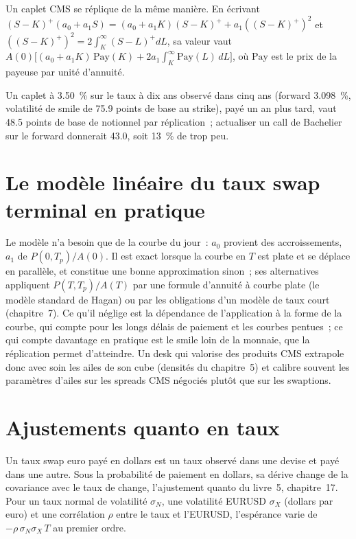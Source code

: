 Un caplet CMS se réplique de la même manière. En écrivant $(S-K)^+(a_0+a_1S) =
(a_0+a_1K)(S-K)^+ + a_1((S-K)^+)^2$ et $((S-K)^+)^2 = 2\int_K^\infty(S-L)^+dL$,
sa valeur vaut $A(0)\bigl[(a_0+a_1K)\,\mathrm{Pay}(K) + 2a_1\int_K^\infty
\mathrm{Pay}(L)\,dL\bigr]$, où $\mathrm{Pay}$ est le prix de la payeuse par unité d'annuité.

\label{lst:rc:convexity-adjustments-and-constant-maturity-products:caplet}

\begin{example}\label{ex:rc:convexity-adjustments-and-constant-maturity-products:caplet}
Un caplet à 3.50~\% sur le taux à dix ans observé dans cinq ans (forward
3.098~\%, volatilité de smile de 75.9 points de base au strike), payé un an
plus tard, vaut 48.5 points de base de notionnel par réplication~; actualiser un
call de Bachelier sur le forward donnerait 43.0, soit 13~\% de trop peu.
\end{example}

\section{Le modèle linéaire du taux swap terminal en pratique}

Le modèle n'a besoin que de la courbe du jour~: $a_0$ provient des accroissements, $a_1$ de
$P(0,T_p)/A(0)$. Il est exact lorsque la courbe en $T$ est plate et se déplace en
parallèle, et constitue une bonne approximation sinon~; ses alternatives appliquent
$P(T,T_p)/A(T)$ par une formule d'annuité à courbe plate (le modèle standard de Hagan)
ou par les obligations d'un modèle de taux court (chapitre~7). Ce qu'il néglige est la
dépendance de l'application à la forme de la courbe, qui compte pour les longs délais de
paiement et les courbes pentues~; ce qui compte davantage en pratique est le smile loin de
la monnaie, que la réplication permet d'atteindre. Un desk qui valorise des produits CMS
extrapole donc avec soin les ailes de son cube (densités du chapitre~5) et calibre souvent
les paramètres d'ailes sur les spreads CMS négociés plutôt que sur les swaptions.

\section{Ajustements quanto en taux}

Un taux swap euro payé en dollars est un taux observé dans une devise et payé dans
une autre. Sous la probabilité de paiement en dollars, sa dérive change de la covariance
avec le taux de change, l'ajustement quanto du livre~5, chapitre~17.
Pour un taux normal de volatilité $\sigma_N$, une volatilité EURUSD $\sigma_X$
(dollars par euro) et une corrélation $\rho$ entre le taux et l'EURUSD, l'espérance
varie de $-\rho\,\sigma_N\sigma_X\,T$ au premier ordre.

